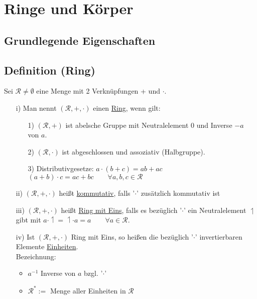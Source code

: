 \documentclass[a4paper, 12pt,titlepage, pdf, headsepline]{article}
\newcommand{\uline}[1]{\underline{#1}}
\renewcommand{\>}{\rightarrow}
\renewcommand{\*}{\cdot}
\begin{document}
	      \section{Ringe und Körper}
	      \subsection*{Grundlegende Eigenschaften}
	      \subsection{Definition (Ring)}
	      Sei $\mathcal{R} \neq \emptyset$ eine Menge mit 2 Verknüpfungen + und $\cdot$.
	      \begin{itemize}
	      	\item[i)] Man nennt $(\mathcal{R}, + , \cdot)$ einen \uline{Ring}, wenn gilt: 
	      	      \begin{itemize}
	      	      	\item[1)] $(\mathcal{R}, + )$ ist abelsche Gruppe mit Neutralelement 0 und Inverse $-a$ von $a$.
	      	      	\item[2)] $(\mathcal{R}, \cdot)$ ist abgeschlossen und assoziativ (Halbgruppe).
	      	      	\item[3)] Distributivgesetze: $a \cdot (b+c) = ab + ac$\\
	      	      	      \noindent\hspace*{32.5mm}$ (a+b) \cdot c = ac + bc \qquad \forall a,b,c \in \mathcal{R}$
	      	      \end{itemize}
	      	\item[ii)] $(\mathcal{R},+,\cdot)$ heißt \uline{kommutativ}, falls '$\cdot$' zusätzlich kommutativ ist
	      	\item[iii)] $(\mathcal{R},+,\cdot)$ heißt \uline{Ring mit Eins}, falls es bezüglich '$\cdot$' ein Neutralelement $\upharpoonleft$ gibt mit $a \cdot \upharpoonleft = \upharpoonleft \cdot a = a \qquad \forall a \in \mathcal{R}$.
	      	\item[iv)] Ist $(\mathcal{R},+,\cdot)$ Ring mit Eins, so heißen die bezüglich '$\cdot$' invertierbaren Elemente \uline{Einheiten}. \\
	      	      Bezeichnung: 
	      	      \begin{itemize}
	      	      	\item $a^{-1}$ Inverse von $a$ bzgl. '$\cdot$' \item $\mathcal{R}^* :=$ Menge aller Einheiten in $\mathcal{R}$
	      	      \end{itemize}
	      \end{itemize}
\end{document}
